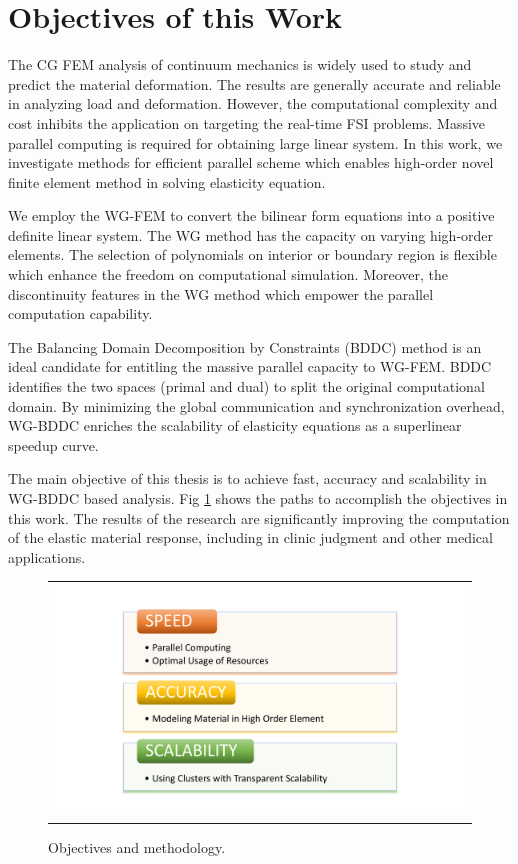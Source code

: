 \section{Objectives of this Work}

The CG FEM analysis of continuum mechanics is widely used to study and predict the material deformation. The results are generally accurate and reliable in analyzing load and deformation. However, the computational complexity and cost inhibits the application on targeting the real-time FSI problems. Massive parallel computing is required for obtaining large linear system. In this work, we investigate methods for efficient parallel scheme which enables high-order novel finite element method in solving elasticity equation.

We employ the WG-FEM to convert the bilinear form equations into a positive definite linear system. The WG method has the capacity on varying high-order elements. The selection of polynomials on interior or boundary region is flexible which enhance the freedom on computational simulation. Moreover, the discontinuity features in the WG method which empower the parallel computation capability.

The Balancing Domain Decomposition by Constraints (BDDC) method is an ideal candidate for entitling the massive parallel capacity to WG-FEM. BDDC identifies the two spaces (primal and dual) to split the original computational domain. By minimizing the global communication and synchronization overhead,  WG-BDDC enriches the scalability of elasticity equations as a superlinear speedup curve.

The main objective of this thesis is to achieve fast, accuracy and scalability in WG-BDDC based analysis. Fig \ref{fig: ch1p4} shows the paths to accomplish the objectives in this work. The results of the research are significantly improving the computation of the elastic material response, including in clinic judgment and other medical applications.

\begin{figure}[H]
	\centering
	\begin{tabular}{c}
		\includegraphics[width=1.0\textwidth]{./pics/ch1p4}
	\end{tabular}
	\caption{\footnotesize Objectives and methodology.} \label{fig: ch1p4}
\end{figure}

